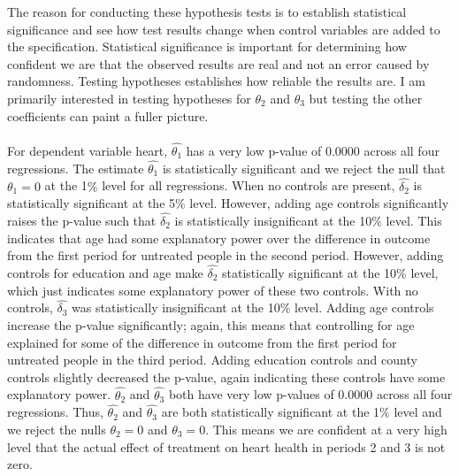\documentclass[a4paper]{article}
\begin{document}
The reason for conducting these hypothesis tests is to establish statistical significance and see how test results change when control variables are added to the specification. Statistical significance is important for determining how confident we are that the observed results are real and not an error caused by randomness. Testing hypotheses establishes how reliable the results are. I am primarily interested in testing hypotheses for $\theta_2$ and $\theta_3$ but testing the other coefficients can paint a fuller picture.
\\
\\
For dependent variable heart, $\hat{\theta_1}$ has a very low p-value of 0.0000 across all four regressions. The estimate $\hat{\theta_1}$ is statistically significant and we reject the null that $\theta_1 = 0$ at the 1$\%$ level for all regressions. When no controls are present, $\hat{\delta_2}$ is statistically significant at the 5$\%$ level. However, adding age controls significantly raises the p-value such that $\hat{\delta_2}$ is statistically insignificant at the 10$\%$ level. This indicates that age had some explanatory power over the difference in outcome from the first period for untreated people in the second period. However, adding controls for education and age make $\hat{\delta_2}$ statistically significant at the 10$\%$ level, which just indicates some explanatory power of these two controls. With no controls, $\hat{\delta_3}$ was statistically insignificant at the 10$\%$ level. Adding age controls increase the p-value significantly; again, this means that controlling for age explained for some of the difference in outcome from the first period for untreated people in the third period. Adding education controls and county controls slightly decreased the p-value, again indicating these controls have some explanatory power. $\hat{\theta_2}$ and $\hat{\theta_3}$ both have very low p-values of 0.0000 across all four regressions. Thus, $\hat{\theta_2}$ and $\hat{\theta_3}$ are both statistically significant at the 1$\%$ level and we reject the nulls $\theta_2 = 0$ and $\theta_3 = 0$. This means we are confident at a very high level that the actual effect of treatment on heart health in periods 2 and 3 is not zero. 
\\
\\
\end{document}
